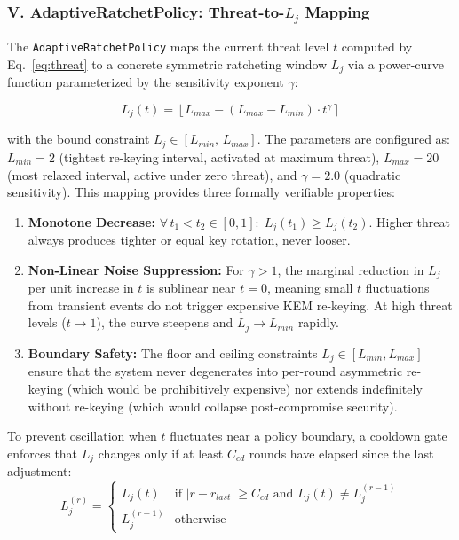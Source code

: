 \documentclass[journal, 10pt, twocolumn]{IEEEtran}
\begin{document}
\subsubsection{V. AdaptiveRatchetPolicy: Threat-to-$L_j$ Mapping}

The \texttt{AdaptiveRatchetPolicy} maps the current threat level $t$ computed by Eq.~\eqref{eq:threat} to a concrete symmetric ratcheting window $L_j$ via a power-curve function parameterized by the sensitivity exponent $\gamma$:

\begin{equation}
L_j(t) = \left\lfloor L_{max} - (L_{max} - L_{min}) \cdot t^{\gamma} \right\rceil
\label{eq:policy}
\end{equation}

with the bound constraint $L_j \in [L_{min},\, L_{max}]$. The parameters are configured as: $L_{min} = 2$ (tightest re-keying interval, activated at maximum threat), $L_{max} = 20$ (most relaxed interval, active under zero threat), and $\gamma = 2.0$ (quadratic sensitivity). This mapping provides three formally verifiable properties:

\begin{enumerate}
    \item \textbf{Monotone Decrease:} $\forall\, t_1 < t_2 \in [0,1]:\; L_j(t_1) \geq L_j(t_2)$. Higher threat always produces tighter or equal key rotation, never looser.
    \item \textbf{Non-Linear Noise Suppression:} For $\gamma > 1$, the marginal reduction in $L_j$ per unit increase in $t$ is sublinear near $t = 0$, meaning small $t$ fluctuations from transient events do not trigger expensive KEM re-keying. At high threat levels ($t \to 1$), the curve steepens and $L_j \to L_{min}$ rapidly.
    \item \textbf{Boundary Safety:} The floor and ceiling constraints $L_j \in [L_{min}, L_{max}]$ ensure that the system never degenerates into per-round asymmetric re-keying (which would be prohibitively expensive) nor extends indefinitely without re-keying (which would collapse post-compromise security).
\end{enumerate}

To prevent oscillation when $t$ fluctuates near a policy boundary, a cooldown gate enforces that $L_j$ changes only if at least $C_{cd}$ rounds have elapsed since the last adjustment:
\begin{equation}
L_j^{(r)} = \begin{cases} L_j(t) & \text{if } |r - r_{last}| \geq C_{cd} \text{ and } L_j(t) \neq L_j^{(r-1)} \\ L_j^{(r-1)} & \text{otherwise} \end{cases}
\label{eq:cooldown}
\end{equation}
\end{document}
